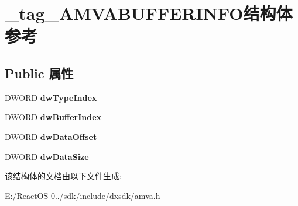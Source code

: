 \hypertarget{struct__tag___a_m_v_a_b_u_f_f_e_r_i_n_f_o}{}\section{\+\_\+tag\+\_\+\+A\+M\+V\+A\+B\+U\+F\+F\+E\+R\+I\+N\+F\+O结构体 参考}
\label{struct__tag___a_m_v_a_b_u_f_f_e_r_i_n_f_o}
\subsection*{Public 属性}
\begin{DoxyCompactItemize}
\item 
\mbox{\label{struct__tag___a_m_v_a_b_u_f_f_e_r_i_n_f_o_ab4d1ba1dae43b34c15207bd7f01e6ab0}} 
D\+W\+O\+RD {\bfseries dw\+Type\+Index}
\item 
\mbox{\label{struct__tag___a_m_v_a_b_u_f_f_e_r_i_n_f_o_ace28e947c3545cfe29a8dc0c373297d6}} 
D\+W\+O\+RD {\bfseries dw\+Buffer\+Index}
\item 
\mbox{\label{struct__tag___a_m_v_a_b_u_f_f_e_r_i_n_f_o_aaac849cc54a698bd66203bbaf4509b5c}} 
D\+W\+O\+RD {\bfseries dw\+Data\+Offset}
\item 
\mbox{\label{struct__tag___a_m_v_a_b_u_f_f_e_r_i_n_f_o_a85804e468f0c82a0a544582d50fc55b7}} 
D\+W\+O\+RD {\bfseries dw\+Data\+Size}
\end{DoxyCompactItemize}


该结构体的文档由以下文件生成\+:\begin{DoxyCompactItemize}
\item 
E\+:/\+React\+O\+S-\/0../sdk/include/dxsdk/amva.\+h\end{DoxyCompactItemize}
